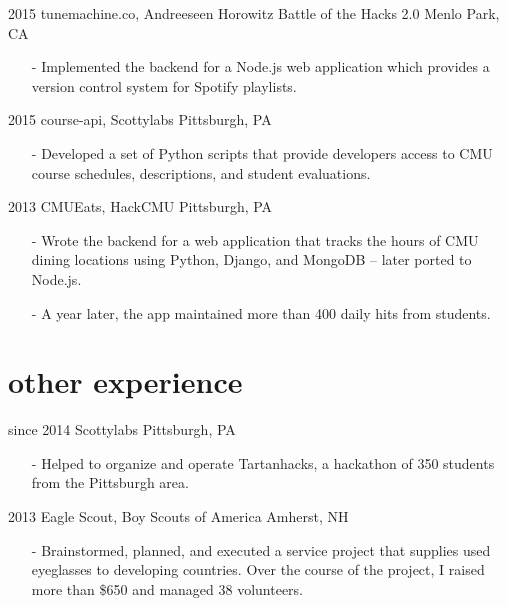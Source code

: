 \documentclass[]{friggeri-cv}
\begin{document}
    \begin{entrylist}
        \entrys
            {2015}
            {tunemachine.co, {\normalfont Andreeseen Horowitz Battle of the Hacks 2.0}}
            {Menlo Park, CA}
            {\begin{itemize}[leftmargin=*]
                \item[-] Implemented the backend for a Node.js web application which provides a version control system for Spotify playlists.
            \end{itemize}}
        \entrys
            {2015}
            {course-api, {\normalfont Scottylabs}}
            {Pittsburgh, PA}
            {\begin{itemize}[leftmargin=*]
                \item[-] Developed a set of Python scripts that provide developers access to CMU course schedules, descriptions, and student evaluations.
            \end{itemize}}
        \entrys
            {2013}
            {CMUEats, {\normalfont HackCMU}}
            {Pittsburgh, PA}
            {\begin{itemize}[leftmargin=*]
                \item[-] Wrote the backend for a web application that tracks the hours of CMU dining locations using Python, Django, and MongoDB -- later ported to Node.js.
                \item[-] A year later, the app maintained more than 400 daily hits from students.
            \end{itemize}}
    \end{entrylist}

    \section{other experience}

    \begin{entrylist}
        \entrys
            {since 2014}
            {Scottylabs}
            {Pittsburgh, PA}
            {\begin{itemize}[leftmargin=*]
                \item[-] Helped to organize and operate Tartanhacks, a hackathon of 350 students from the Pittsburgh area.
            \end{itemize}}
        \entrys
            {2013}
            {Eagle Scout, {\normalfont Boy Scouts of America}}
            {Amherst, NH}
            {\begin{itemize}[leftmargin=*]
                \item[-] Brainstormed, planned, and executed a service project that supplies used eyeglasses to developing countries. Over the course of the project, I raised more than \$650 and managed 38 volunteers.
            \end{itemize}}
    \end{entrylist}
\end{document}
